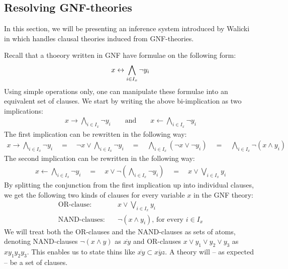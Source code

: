 
\subsection{Resolving GNF-theories}
\label{sub:Resolving GNF-theories}
In this section, we will be presenting an inference system introduced by Walicki in \cite{} which handles clausal theories induced from GNF-theories.

Recall that a thoeory written in GNF have formulae on the following form:
\begin{align}
  x \leftrightarrow \bigwedge_{i \in I_x} \neg y_i
\end{align}
Using simple operations only, one can manipulate these formulae into an equivalent set of clauses.
We start by writing the above bi-implication as two implications:
\begin{align}
  x \rightarrow \bigwedge_{i \in I_x} \neg y_i \quad\quad \text{and} \quad\quad x \leftarrow \bigwedge_{i \in I_x} \neg y_i
\end{align}
The first implication can be rewritten in the following way:
\begin{align}
  x \rightarrow \bigwedge_{i \in I_x} \neg y_i
  \quad=\quad \neg x \vee \bigwedge_{i \in I_x} \neg y_i
  \quad=\quad \bigwedge_{i \in I_x} (\neg x \vee \neg y_i)
  \quad=\quad \bigwedge_{i \in I_x} \neg (x \wedge y_i)
\end{align}
The second implication can be rewritten in the following way:
\begin{align}
  x \leftarrow \bigwedge_{i \in I_x} \neg y_i
  \quad=\quad x \vee \neg \left( \bigwedge_{i \in I_x} \neg y_i \right)
  \quad=\quad x \vee \bigvee_{i \in I_x} y_i
\end{align}
By splitting the conjunction from the first implication up into individual clauses, we get the following two kinds of clauses for every variable $x$ in the GNF theory:
\begin{align}
  \text{OR-clause:}&\quad x \vee \bigvee_{i \in I_x} y_i\\
  \text{NAND-clauses:}&\quad \neg (x \wedge y_i)\text{, for every }i \in I_x
\end{align}
We will treat both the OR-clauses and the NAND-clauses as sets of atoms, denoting NAND-clauses $\neg (x \wedge y)$ as $\overline{xy}$ and OR-clauses $x \vee y_1 \vee y_2 \vee y_3$ as $xy_1y_2y_3$.
This enables us to state thins like $\overline{xy} \subset \overline{xyz}$.
A theory will -- as expected -- be a set of clauses.

